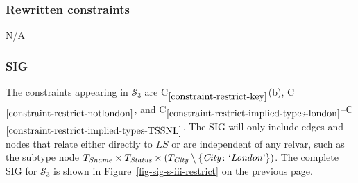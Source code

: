 \documentclass{article}
\newcounter{constraint}
\newcommand{\identifier}[1]{\ensuremath{\mathit{#1}}}
\newcommand{\LS}{\identifier{LS}}
\newcommand{\Sname}{\identifier{Sname}}
\newcommand{\Status}{\identifier{Status}}
\newcommand{\City}{\identifier{City}}
\newcommand{\Type}[1]{\ensuremath{T_{#1}}}
\newcommand{\CityLondon}{\ensuremath{\{\City\colon\allowbreak\text{`\emph{London}'}\}}}
\newcommand{\TCityMinusLondon}{\ensuremath{\Type{\City} \setminus \CityLondon}}
\newcommand{\TSSNL}{\ensuremath{\Type{\Sname} \times \Type{\Status} \times (\TCityMinusLondon)}}
\newcommand{\schema}[1]{\ensuremath{\mathcal{S}_{#1}}}
\newcommand{\Constraint}[2][]{C\ensuremath{_{#2}\ifx&#1&\else^{#1}\fi}}
\begin{document}

\subsubsection{Rewritten constraints}
\label{sec-constraints-s-iii-restrict}

\noindent N/A




\subsubsection{SIG}
\label{sec-sigs-s-iii-restrict}

\noindent The constraints appearing in \(\schema{3}\) are \Constraint{\ref{constraint-restrict-key}}(b), \Constraint{\ref{constraint-restrict-notlondon}}, and \Constraint{\ref{constraint-restrict-implied-types-london}}--\Constraint{\ref{constraint-restrict-implied-types-TSSNL}}. The SIG will only include edges and nodes that relate either directly to \(\LS\) or are independent of any relvar, such as the subtype node \(\TSSNL\). The complete SIG for \(\schema{3}\) is shown in Figure~\ref{fig-sig-s-iii-restrict} on the previous page.

\end{document}
